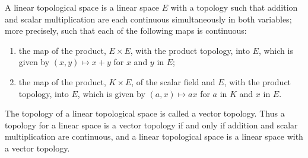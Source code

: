 A linear topological space is a linear space $E$ with a topology such that addition and scalar multiplication are each continuous simultaneously in both variables; more precisely, such that each of the following maps is continuous:
\begin{enumerate}
\item[(a)] the map of the product, $E \times E$, with the product topology, into $E$, which is given by $(x, y) \mapsto x + y$ for $x$ and $y$ in $E$;
\item[(b)] the map of the product, $K \times E$, of the scalar field and $E$, with the product topology, into $E$, which is given by $(a, x) \mapsto a x$ for $a$ in $K$ and $x$ in $E$.
\end{enumerate}
The topology of a linear topological space is called a vector topology. Thus a topology for a linear space is a vector topology if and only if addition and scalar multiplication are continuous, and a linear topological space is a linear space with a vector topology.
